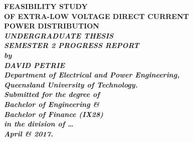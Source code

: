 \begin{titlepage}
\renewcommand{\baselinestretch}{1.0}
\begin{center}
\vspace*{35mm}
\Huge\bf
		FEASIBILITY STUDY\\
		OF EXTRA-LOW VOLTAGE DIRECT CURRENT\\
		POWER DISTRIBUTION\\
\vspace{6mm}
\large\sl\bf
		UNDERGRADUATE THESIS\\
\vspace{4mm}
\large\sl\bf
		SEMESTER 2 PROGRESS REPORT\\
\vspace{13mm}
\large\sl
		by\\
		DAVID PETRIE
		\medskip\\
\rm
		Department of Electrical and Power Engineering,\\
		Queensland University of Technology.\\
\vspace{20mm}
		Submitted for the degree of\\
		Bachelor of Engineering \& \\
		Bachelor of Finance (IX28)
		\smallskip\\ [2cm]
\normalsize
		in the division of \ldots
		\medskip\\
\large
		April \& 2017.		
\end{center}
\end{titlepage}
\afterpage{\null\newpage}